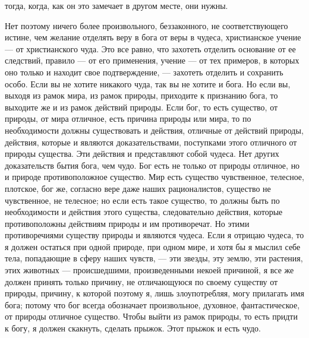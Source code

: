 \documentclass[12pt]{article}
\begin{document}
тогда, когда, как он это замечает в другом месте, они нужны. 

Нет поэтому ничего более произвольного, беззаконного, не соответствующего истине, чем желание отделять веру в бога от веры в чудеса, христианское учение --- от христианского чуда. Это все равно, что захотеть отделить основание от ее следствий, правило --- от его применения, учение --- от тех примеров, в которых оно только и находит свое подтверждение, --- захотеть отделить и сохранить особо. Если вы не хотите никакого чуда, так вы не хотите и бога. Но если вы, выходя из рамок мира, из рамок природы, приходите к признанию бога, то выходите же и из рамок действий природы. Если бог, то есть существо, от природы, от мира отличное, есть причина природы или мира, то по необходимости должны существовать и действия, отличные от действий природы, действия, которые и являются доказательствами, поступками этого отличного от природы существа. Эти действия и представляют собой чудеса. Нет других доказательств бытия бога, чем чудо. Бог есть не только от природы отличное, но и природе противоположное существо. Мир есть существо чувственное, телесное, плотское, бог же, согласно вере даже наших рационалистов, существо не чувственное, не телесное; но если есть такое существо, то должны быть по необходимости и действия этого существа, следовательно действия, которые противоположны действиям природы и им противоречат. Но этими противоречиями существу природы и являются чудеса. Если я отрицаю чудеса, то я должен остаться при одной природе, при одном мире, и хотя бы я мыслил себе тела, попадающие в сферу наших чувств, --- эти звезды, эту землю, эти растения, этих животных --- происшедшими, произведенными некоей причиной, я все же должен принять только причину, не отличающуюся по своему существу от природы, причину, к которой поэтому я, лишь злоупотребляя, могу прилагать имя бога; потому что бог всегда обозначает произвольное, духовное, фантастическое, от природы отличное существо. Чтобы выйти из рамок природы, то есть придти к богу, я должен скакнуть, сделать прыжок. Этот прыжок и есть чудо. 
\end{document}
